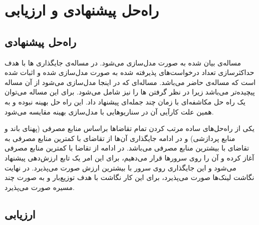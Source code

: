 \chapter{راه‌حل پیشنهادی و ارزیابی}

\section{راه‌حل پیشنهادی}

مساله‌ی بیان شده به صورت 
مدل‌سازی می‌شود.
در \cite{Eramo2016}
مساله‌ی جایگذاری ها با هدف حداکثرسازی تعداد درخواست‌های پذیرفته شده
به صورت  مدل‌سازی شده و اثبات شده است که مساله‌ی حاضر  می‌باشد.
مساله‌ای که در اینجا مدل‌سازی می‌شود از آن مساله پیچیده‌تر می‌باشد زیرا در نظر گرفتن ها را نیز شامل می‌شود.
برای این مساله می‌توان
یک راه حل مکاشفه‌ای با زمان چند جمله‌ای
پیشنهاد داد. این راه حل بهینه نبوده و به همین علت کارآیی آن
در سناریوهایی با مدل‌سازی بهینه مقایسه می‌شود.

یکی از راه‌حل‌های ساده مرتب کردن تمام تقاضاها براساس منابع مصرفی (پهنای باند و منابع پردازشی)
و در ادامه جایگذاری آن‌ها از تقاضای با کمترین منابع مصرفی به تقاضای با بیشترین منابع مصرفی می‌باشد.
در ادامه از تقاضا با کمترین منابع مصرفی آغاز کرده و آن را روی سرورها قرار می‌دهیم، برای این امر یک تابع ارزش‌دهی پیشنهاد می‌شود
و این جایگذاری روی سرور با بیشترین ارزش صورت می‌پذیرد.
در نهایت نگاشت لینک‌ها صورت می‌پذیرد، برای این کار نگاشت با هدف توزیع‌بار و به صورت چند مسیره صورت می‌پذیرد.

\section{ارزیابی}